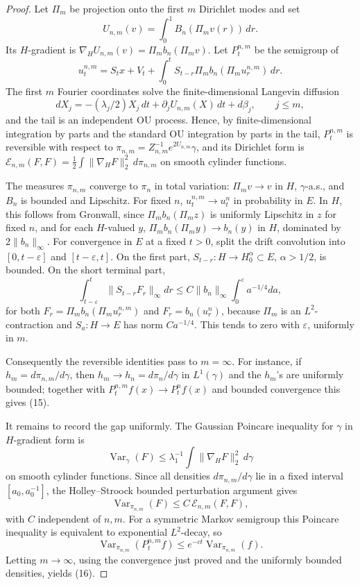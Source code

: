 \documentclass[12pt]{article}
\newcommand{\1}{\mathbf 1}
\newcommand{\Var}{\operatorname{Var}}
\newcommand{\calE}{\mathcal E}
\begin{document}
\begin{proof}
Let \(\Pi_m\) be projection onto the first \(m\) Dirichlet modes and set
\[
        U_{n,m}(v)=\int_0^1B_n(\Pi_m v(r))\,dr .
\]
Its \(H\)-gradient is \(\nabla_HU_{n,m}(v)=\Pi_m b_n(\Pi_m v)\).  Let
\(P_t^{n,m}\) be the semigroup of
\[
u_t^{n,m}=S_t x+V_t+\int_0^tS_{t-r}\Pi_m b_n(\Pi_m u_r^{n,m})\,dr .
\]
The first \(m\) Fourier coordinates solve the finite-dimensional Langevin
diffusion
\[
dX_j=-(\lambda_j/2)X_j\,dt+\partial_j U_{n,m}(X)\,dt+d\beta_j,
\qquad j\le m,
\]
and the tail is an independent OU process.  Hence, by finite-dimensional
integration by parts and the standard OU integration by parts in the tail,
\(P_t^{n,m}\) is reversible with respect to
\(\pi_{n,m}=Z_{n,m}^{-1}e^{2U_{n,m}}\gamma\), and its Dirichlet form is
\(\calE_{n,m}(F,F)=\frac12\int\|\nabla_HF\|_2^2\,d\pi_{n,m}\) on smooth
cylinder functions.

The measures \(\pi_{n,m}\) converge to \(\pi_n\) in total variation: \(\Pi_m
v\to v\) in \(H\), \(\gamma\)-a.s., and \(B_n\) is bounded and Lipschitz.  For
fixed \(n\), \(u_t^{n,m}\to u_t^n\) in probability in \(E\).  In \(H\), this
follows from Gronwall, since \(\Pi_m b_n(\Pi_m z)\) is uniformly Lipschitz in
\(z\) for fixed \(n\), and for each \(H\)-valued \(y\),
\(\Pi_m b_n(\Pi_m y)\to b_n(y)\) in \(H\), dominated by \(2\|b_n\|_\infty\).
For convergence in \(E\) at a fixed \(t>0\), split the drift convolution into
\([0,t-\varepsilon]\) and \([t-\varepsilon,t]\).  On the first part,
\(S_{t-r}:H\to H^\alpha_0\subset E\), \(\alpha>1/2\), is bounded.  On the
short terminal part,
\[
 \int_{t-\varepsilon}^t\|S_{t-r}F_r\|_\infty dr
 \le C\|b_n\|_\infty\int_0^\varepsilon a^{-1/4}da,
\]
for both \(F_r=\Pi_m b_n(\Pi_mu_r^{n,m})\) and \(F_r=b_n(u_r^n)\), because
\(\Pi_m\) is an \(L^2\)-contraction and \(S_a:H\to E\) has norm \(Ca^{-1/4}\).
This tends to zero with \(\varepsilon\), uniformly in \(m\).

Consequently the reversible identities pass to \(m=\infty\).  For instance,
if \(h_m=d\pi_{n,m}/d\gamma\), then \(h_m\to h_n=d\pi_n/d\gamma\) in
\(L^1(\gamma)\) and the \(h_m\)'s are uniformly bounded; together with
\(P_t^{n,m}f(x)\to P_t^nf(x)\) and bounded convergence this gives (15).

It remains to record the gap uniformly.  The Gaussian Poincare inequality for
\(\gamma\) in \(H\)-gradient form is
\[
        \Var_\gamma(F)\le \lambda_1^{-1}\int\|\nabla_HF\|_2^2\,d\gamma
\]
on smooth cylinder functions.  Since all densities
\(d\pi_{n,m}/d\gamma\) lie in a fixed interval \([a_0,a_0^{-1}]\), the
Holley--Stroock bounded perturbation argument gives
\[
        \Var_{\pi_{n,m}}(F)\le C\,\calE_{n,m}(F,F),
\]
with \(C\) independent of \(n,m\).  For a symmetric Markov semigroup this
Poincare inequality is equivalent to exponential \(L^2\)-decay, so
\[
 \Var_{\pi_{n,m}}(P_t^{n,m}f)\le e^{-ct}\Var_{\pi_{n,m}}(f).
\]
Letting \(m\to\infty\), using the convergence just proved and the uniformly
bounded densities, yields (16).
\end{proof}
\end{document}
